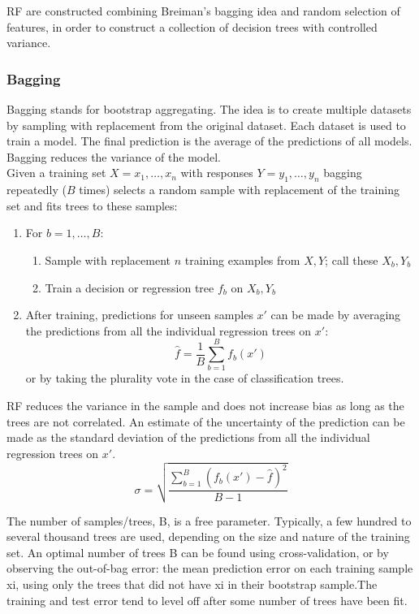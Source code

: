 RF are constructed combining Breiman's bagging idea and random selection of features, in order to construct a collection of decision trees with controlled variance.

\subsubsection{Bagging}
Bagging stands for bootstrap aggregating. The idea is to create multiple datasets by sampling with replacement from the original dataset. Each dataset is used to train a model. The final prediction is the average of the predictions of all models. Bagging reduces the variance of the model.\\

Given a training set $X=x_1,\ldots,x_n$ with responses $Y=y_1,\ldots,y_n$ bagging repeatedly ($B$ times) selects a random sample with replacement of the training set and fits trees to these samples:\\
\begin{enumerate}
    \item For $b=1,\ldots,B$:
    \begin{enumerate}
        \item Sample with replacement $n$ training examples from $X,Y$; call these $X_b,Y_b$
        \item Train a decision or regression tree $f_b$ on $X_b,Y_b$
    \end{enumerate}
    \item After training, predictions for unseen samples $x'$ can be made by averaging the predictions from all the individual regression trees on $x'$:
    \begin{equation*}
        \hat{f}=\frac{1}{B}\sum_{b=1}^Bf_b(x')
    \end{equation*}
    or by taking the plurality vote in the case of classification trees.
\end{enumerate}

RF reduces the variance in the sample and does not increase bias as long as the trees are not correlated.
An estimate of the uncertainty of the prediction can be made as the standard deviation of the predictions from all the individual regression trees on $x'$.
\begin{equation}
    \sigma=\sqrt{\frac{\sum_{b=1}^B(f_b(x')-\hat{f})^2}{B-1}}
\end{equation}

The number of samples/trees, B, is a free parameter. Typically, a few hundred to several thousand
trees are used, depending on the size and nature of the training set. An optimal number of trees B can
be found using cross-validation, or by observing the out-of-bag error: the mean prediction error on
each training sample xi, using only the trees that did not have xi in their bootstrap sample.The
training and test error tend to level off after some number of trees have been fit.

